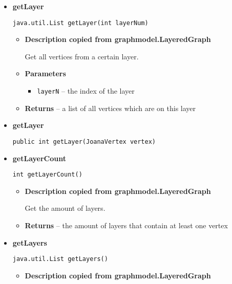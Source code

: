 {{{{{{{{{{{{{\begin{itemize}
{\begin{itemize}
{Returns the height, i.e. the number of layers.
}
\item{{\bf  Returns} -- 
the height 
}%
\end{itemize}
}%
\item{ 
{\bf  getLayer}\\
\begin{lstlisting}[frame=none]
java.util.List getLayer(int layerNum)\end{lstlisting} %
\begin{itemize}
\item{
{\bf  Description copied from graphmodel.LayeredGraph{\small {}} }

Get all vertices from a certain layer.
}
\item{
{\bf  Parameters}
  \begin{itemize}
   \item{
\texttt{layerN} -- the index of the layer}
  \end{itemize}
}%
\item{{\bf  Returns} -- 
a list of all vertices which are on this layer 
}%
\end{itemize}
}%
\item{ 
{\bf  getLayer}\\
\begin{lstlisting}[frame=none]
public int getLayer(JoanaVertex vertex)\end{lstlisting} %
}%
\item{ 
{\bf  getLayerCount}\\
\begin{lstlisting}[frame=none]
int getLayerCount()\end{lstlisting} %
\begin{itemize}
\item{
{\bf  Description copied from graphmodel.LayeredGraph{\small {}} }

Get the amount of layers.
}
\item{{\bf  Returns} -- 
the amount of layers that contain at least one vertex 
}%
\end{itemize}
}%
\item{ 
{\bf  getLayers}\\
\begin{lstlisting}[frame=none]
java.util.List getLayers()\end{lstlisting} %
\begin{itemize}
\item{
{\bf  Description copied from graphmodel.LayeredGraph{\small {}} }

}
\end{itemize}}
\end{itemize}}}}}}}}}}}}}}
